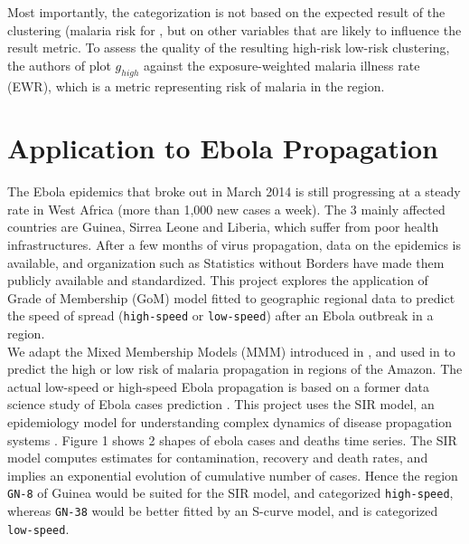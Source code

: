 \documentclass[twoside]{article}
\begin{document}
Most importantly, the categorization is not based on the expected result of the clustering (malaria risk for \cite{malaria}, but on other variables that are likely to influence the result metric. To assess the quality of the resulting high-risk low-risk clustering, the authors of \cite{malaria} plot $g_{high}$ against the exposure-weighted malaria illness rate (EWR), which is a metric representing risk of malaria in the region.



\section{Application to Ebola Propagation}

The Ebola epidemics that broke out in March 2014 is still progressing at a steady rate in West Africa (more than 1,000 new cases a week). The 3 mainly affected countries are Guinea, Sirrea Leone and Liberia, which suffer from poor health infrastructures. After a few months of virus propagation, data on the epidemics is available, and organization such as Statistics without Borders have made them publicly available and standardized. This project explores the application of Grade of Membership (GoM) model fitted to geographic regional data to predict the speed of spread (\texttt{high-speed} or \texttt{low-speed}) after an Ebola outbreak in a region.\\

We adapt the Mixed Membership Models (MMM) introduced in \cite{mixmem}, and used in \cite{malaria} to predict the high or low risk of malaria propagation in regions of the Amazon. The actual low-speed or high-speed Ebola propagation is based on a former data science study of Ebola cases prediction \cite{ebolpred}. This project uses the SIR model, an epidemiology model for understanding complex dynamics of disease propagation systems \cite{sirwik}. Figure 1 shows 2 shapes of ebola cases and deaths time series. The SIR model computes estimates for contamination, recovery and death rates, and implies an exponential evolution of cumulative number of cases. Hence the region \texttt{GN-8} of Guinea would be suited for the SIR model, and categorized \texttt{high-speed}, whereas \texttt{GN-38} would be better fitted by an S-curve model, and is categorized \texttt{low-speed}.
\vspace{.1 in}
\end{document}

